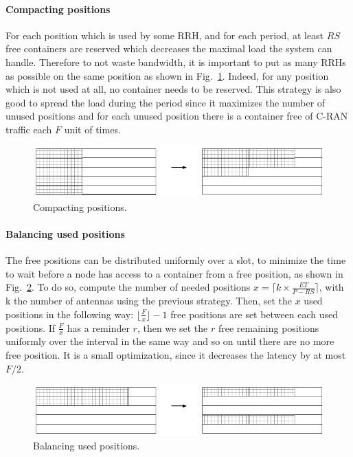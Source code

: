\documentclass[10pt, conference, letterpaper]{IEEEtran}
\begin{document}
\paragraph{Compacting positions}

For each position which is used by some RRH, and for each period, at least $RS$ free containers are reserved which decreases the maximal load the system can handle. Therefore to not waste bandwidth, it is important to put as many RRHs as possible on the same position as shown in Fig.~\ref{fig:packing}. Indeed, for any position which is not used at all, no container needs to be reserved. This strategy is also good to spread the load during the period since it maximizes the number of unused positions and for each unused position there is a container free of C-RAN traffic each $F$ unit of times. 
\begin{figure}[h!]
\begin{center}   

      \includegraphics[scale=0.5]{repart0}
     \caption{Compacting positions.}\label{fig:packing}
     
\end{center}
  \end{figure}
       \vspace{-0.4cm}

\paragraph{Balancing used positions}

The free positions can be distributed uniformly over a slot, to minimize the time to wait before a node has access to a container from a free position, as shown in Fig.~\ref{fig:slotbal}. To do so, compute the number of needed positions $x = \lceil k\times \frac{ET}{P - RS}\rceil$, with k the number of antennas using the previous strategy. Then, set the $x$ used positions in the following way: $\lfloor\frac{F}{x}\rfloor -1 $ free positions are set between each used positions. If $\frac{F}{x}$ has a reminder $r$, then we set the $r$ free remaining positions uniformly over the interval in the same way and so on until there are no more free position. It is a small optimization, since it decreases the latency by at most $F/2$.
     \vspace{-0.4cm}
\begin{figure}[h!]
\begin{center}   
      \includegraphics[scale=0.55]{repart1}
     \caption{Balancing used positions.}\label{fig:slotbal}
\end{center}
  \end{figure}
     \vspace{-0.4cm}
\end{document}
